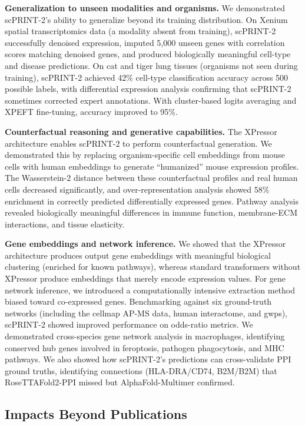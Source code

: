 \textbf{Generalization to unseen modalities and organisms.} We demonstrated \gls{scPRINT}-2's
ability to generalize beyond its training distribution. On Xenium spatial transcriptomics data (a
modality absent from training), \gls{scPRINT}-2 successfully denoised expression, imputed 5,000
unseen genes with correlation scores matching denoised genes, and produced biologically meaningful
cell-type and disease predictions. On cat and tiger lung tissues (organisms not seen during
training), \gls{scPRINT}-2 achieved 42\% cell-type classification accuracy across 500 possible
labels, with differential expression analysis confirming that \gls{scPRINT}-2 sometimes corrected
expert annotations. With cluster-based logits averaging and \gls{XPEFT} fine-tuning, accuracy
improved to 95\%.

\textbf{Counterfactual reasoning and generative capabilities.} The XPressor architecture enables
\gls{scPRINT}-2 to perform counterfactual generation. We demonstrated this by replacing
organism-specific cell embeddings from mouse cells with human embeddings to generate
``humanized'' mouse expression profiles. The Wasserstein-2 distance between these counterfactual
profiles and real human cells decreased significantly, and over-representation analysis showed
58\% enrichment in correctly predicted differentially expressed genes. Pathway analysis revealed
biologically meaningful differences in immune function, membrane-\gls{ECM} interactions, and
tissue elasticity.

\textbf{Gene embeddings and network inference.} We showed that the XPressor architecture produces
output gene embeddings with meaningful biological clustering (enriched for known pathways), whereas
standard transformers without XPressor produce embeddings that merely encode expression values.
For gene network inference, we introduced a computationally intensive extraction method biased
toward co-expressed genes. Benchmarking against six ground-truth networks (including the cellmap
\gls{AP-MS} data, human interactome, and \gls{gwps}), \gls{scPRINT}-2 showed improved performance
on odds-ratio metrics. We demonstrated cross-species gene network analysis in macrophages,
identifying conserved hub genes involved in feroptosis, pathogen phagocytosis, and \gls{MHC}
pathways. We also showed how \gls{scPRINT}-2's predictions can cross-validate \gls{PPI} ground
truths, identifying connections (HLA-DRA/CD74, B2M/B2M) that RoseTTAFold2-\gls{PPI} missed but
AlphaFold-Multimer confirmed.

\subsection{Impacts Beyond Publications}

